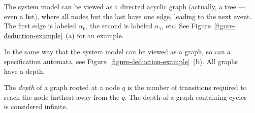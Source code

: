 The system model can be viewed as a directed acyclic graph (actually, a tree
--- even a list), where all nodes but the last have one edge, leading to the
next event. The first edge is labeled $\alpha_0$, the second is labeled
$\alpha_1$, etc. See Figure~\ref{figure-deduction-example}~(a) for an example.

In the same way that the system model can be viewed as a graph, so can a
specification automata, see Figure~\ref{figure-deduction-example}~(b). All
graphs have a depth.

\begin{mydef}\label{def-graph-depth}
The \textit{depth} of a graph rooted at a node $q$ is the number of transitions
required to reach the node farthest away from the $q$. The depth of a graph
containing cycles is considered infinite.
\end{mydef}


